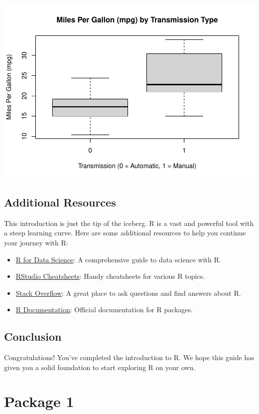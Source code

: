 \documentclass[
]{book}
\providecommand{\tightlist}{%
  \setlength{\itemsep}{0pt}\setlength{\parskip}{0pt}}
\begin{document}
\includegraphics{_main_files/figure-latex/unnamed-chunk-12-1.pdf}

\section{Additional Resources}\label{additional-resources}

This introduction is just the tip of the iceberg. R is a vast and powerful tool with a steep learning curve. Here are some additional resources to help you continue your journey with R:

\begin{itemize}
\tightlist
\item
  \href{https://r4ds.had.co.nz/}{R for Data Science}: A comprehensive guide to data science with R.
\item
  \href{https://www.rstudio.com/resources/cheatsheets/}{RStudio Cheatsheets}: Handy cheatsheets for various R topics.
\item
  \href{https://stackoverflow.com/}{Stack Overflow}: A great place to ask questions and find answers about R.
\item
  \href{https://www.rdocumentation.org/}{R Documentation}: Official documentation for R packages.
\end{itemize}

\section{Conclusion}\label{conclusion}

Congratulations! You've completed the introduction to R. We hope this guide has given you a solid foundation to start exploring R on your own.

\chapter{Package 1}\label{package-1}

  
\end{document}
